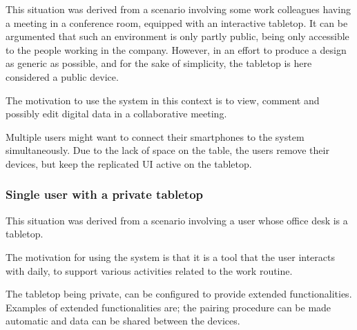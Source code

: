 This situation was derived from a scenario involving some work colleagues having a meeting in a conference room, equipped with an interactive tabletop.
It can be argumented that such an environment is only partly public, being only accessible to the people working in the company.
However, in an effort to produce a design as generic as possible, and for the sake of simplicity, the tabletop is here considered a public device.

The motivation to use the system in this context is to view, comment and possibly edit digital data in a collaborative meeting.

Multiple users might want to connect their smartphones to the system simultaneously.
Due to the lack of space on the table, the users remove their devices, but keep the replicated UI active on the tabletop.


\subsubsection{Single user with a private tabletop}

This situation was derived from a scenario involving a user whose office desk is a tabletop.

The motivation for using the system is that it is a tool that the user interacts with daily, to support various activities related to the work routine.

The tabletop being private, can be configured to provide extended functionalities.
Examples of extended functionalities are; the pairing procedure can be made automatic and data can be shared between the devices.


